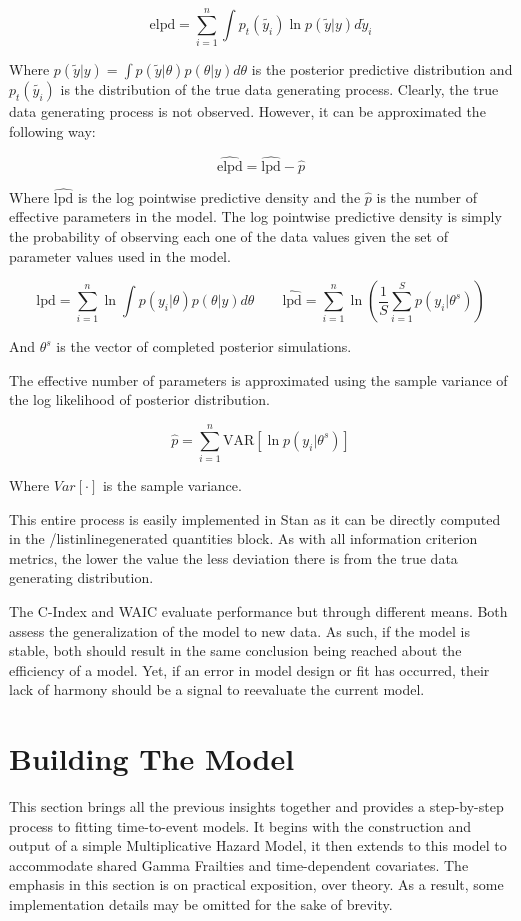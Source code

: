 $$ \text{elpd} = \sum_{i=1}^n \int p_t(\tilde{y_i})\ln p(\tilde{y}|y) d\tilde{y}_i $$

Where $p(\tilde{y}|y) = \int p(\tilde{y}|\theta)p(\theta|y) d\theta$ is the posterior predictive distribution and $p_t(\tilde{y_i})$ is the distribution of the true data generating process. Clearly, the true data generating process is not observed. However, it can be approximated the following way:

$$\hat{\text{elpd}} = \hat{\text{lpd}} - \hat{p}$$

Where $\hat{\text{lpd}}$ is the log pointwise predictive density and the $\hat{p}$ is the number of effective parameters in the model. The log pointwise predictive density is simply the probability of observing each one of the data values given the set of parameter values used in the model.

$$ \text{lpd} = \sum_{i=1}^n \ln \int p(y_i|\theta)p(\theta|y) d\theta \qquad \hat{\text{lpd}} = \sum_{i=1}^n \ln\left ( \frac{1}{S} \sum_{i = 1}^S p(y_i|\theta^s)  \right ) $$

And $\theta^s$ is the vector of completed posterior simulations. 

The effective number of parameters is approximated using the sample variance of the log likelihood of posterior distribution.

$$ \hat{p} = \sum^n_{i=1} \text{VAR}[\ln p(y_i|\theta^s)] $$

Where $Var[\cdot]$ is the sample variance.

This entire process is easily implemented in Stan as it can be directly computed in the /listinline{generated quantities{}} block\cite{Vehtari2014}. As with all information criterion metrics, the lower the value the less deviation there is from the true data generating distribution. 

The C-Index and WAIC evaluate performance but through different means. Both assess the generalization of the model to new data. As such, if the model is stable, both should result in the same conclusion being reached about the efficiency of a model. Yet, if an error in model design or fit has occurred, their lack of harmony should be a signal to reevaluate the current model. 




\section*{Building The Model}

This section brings all the previous insights together and provides a step-by-step process to fitting time-to-event models. It begins with the construction and output of a simple Multiplicative Hazard Model, it then extends to this model to accommodate shared Gamma Frailties and time-dependent covariates. The emphasis in this section is on practical exposition, over theory. As a result, some implementation details may be omitted for the sake of brevity. 

